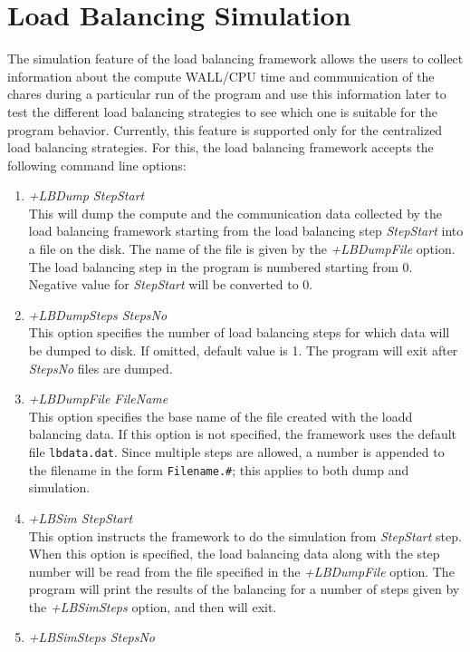 \section{Load Balancing Simulation}

The simulation feature of the load balancing framework allows the users to collect information
about the compute WALL/CPU time and communication of the chares during a particular run of
the program and use this information later to test the different load balancing strategies to
see which one is suitable for the program behavior. Currently, this feature is supported only for
the centralized load balancing strategies. For this, the load balancing framework
accepts the following command line options:
\begin{enumerate}
\item {\em +LBDump StepStart}\\
        This will dump the compute and the communication data collected by the load balancing framework
	starting from the load balancing step {\em StepStart} into a file on the disk. The name of the file
	is given by the {\em +LBDumpFile} option. The load balancing step in the
  program is numbered starting from 0. Negative value for {\em StepStart} will be converted to 0.
\item {\em +LBDumpSteps StepsNo}\\
        This option specifies the number of load balancing steps for which data will be dumped to disk.
        If omitted, default value is 1. The program will exit after {\em StepsNo} files are dumped.
\item {\em +LBDumpFile FileName}\\
        This option specifies the base name of the file created with the loadd balancing data. If this
	option is not specified, the framework uses the default file {\tt lbdata.dat}. Since multiple steps are allowed,
	a number is appended to the filename in the form {\tt Filename.\#}; this applies to both dump and
	simulation.
\item {\em +LBSim StepStart}\\
	This option instructs the framework to do the simulation from {\em StepStart} step.
	When this option is specified, the load balancing data along with the step
  number will be read from the file specified in the {\em +LBDumpFile}
	option. The program will print the results of the balancing for a number of steps given
  by the {\em +LBSimSteps} option, and then will exit.
\item {\em +LBSimSteps StepsNo}\\

\end{enumerate}
